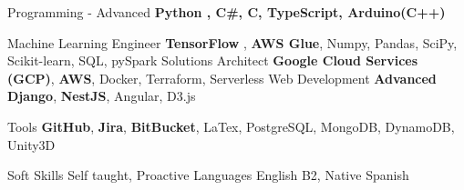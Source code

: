 

\begin{cvskills}

  \cvskill
  {Programming - Advanced} %
  {\textbf{Python , C\#, C, TypeScript, Arduino(C++)}} %

  \cvskill
  {Machine Learning Engineer}
  {\textbf{TensorFlow} , \textbf{AWS Glue}, Numpy, Pandas, SciPy, Scikit-learn, SQL, pySpark}
  \cvskill
  {Solutions Architect}
  {\textbf{Google Cloud Services (GCP)}, \textbf{AWS}, Docker, Terraform, Serverless}
  \cvskill
  {Web Development} %
  {\textbf{Advanced Django}, \textbf{NestJS}, Angular, D3.js} %

  \cvskill
  {Tools}
  {\textbf{GitHub}, \textbf{Jira}, \textbf{BitBucket}, LaTex, PostgreSQL, MongoDB, DynamoDB, Unity3D}

  \cvskill
  {Soft Skills}
  {Self taught, Proactive}
  \cvskill
  {Languages} %
  {English B2, Native Spanish} %

\end{cvskills}
